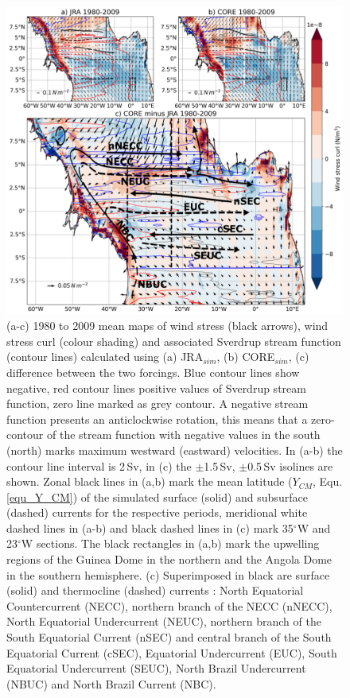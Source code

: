 \documentclass[os, manuscript]{copernicus}
\begin{document}
	\begin{figure}[t]
		\includegraphics[width=12cm]{../../figures/paper/f01_mean_curl_and_current_schema.png}
		\caption{(a-c) 1980 to 2009 mean maps of wind stress (black arrows), wind stress curl (colour shading) and associated Sverdrup stream function (contour lines) calculated using (a) JRA$_{sim}$, (b) CORE$_{sim}$, (c) difference between the two forcings. Blue contour lines show negative, red contour lines positive values of Sverdrup stream function, zero line marked as grey contour. A negative stream function presents an anticlockwise rotation, this means that a zero-contour of the stream function with negative values in the south (north) marks maximum westward (eastward) velocities. In (a-b) the contour line interval is 2$\,$Sv, in (c) the $\pm$1.5$\,$Sv, $\pm$0.5$\,$Sv isolines are shown. Zonal black lines in (a,b) mark the mean latitude ($ Y_{CM} $, Equ. \ref{equ_Y_CM}) of the simulated surface (solid) and subsurface (dashed) currents for the respective periods, meridional white dashed lines in (a-b) and black dashed lines in (c) mark 35$^{\circ}$W and 23$^{\circ}$W sections. The black rectangles in (a,b) mark the upwelling regions of the Guinea Dome in the northern and the Angola Dome in the southern hemisphere. (c) Superimposed in black are surface (solid) and thermocline (dashed) currents \citep[adapted from][based on observations]{Burmeister2019}: North Equatorial Countercurrent (NECC), northern branch of the NECC (nNECC), North Equatorial Undercurrent (NEUC), northern branch of the South Equatorial Current (nSEC) and central branch of the South Equatorial Current (cSEC), Equatorial Undercurrent (EUC), South Equatorial Undercurrent (SEUC), North Brazil Undercurrent (NBUC) and North Brazil Current (NBC).}
		\label{fig_mean_curl}
	\end{figure}
	
\end{document}

